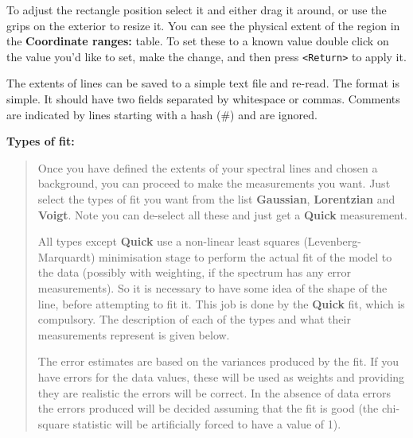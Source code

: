 \documentclass[twoside,11pt]{article}
\renewcommand{\_}{\texttt{\symbol{95}}}
\newcommand{\labelitem}[1]{\textbf{#1}}
\newcommand{\hitext}[1]{\texttt{#1}}
\newcommand{\subheading}[1]{\textbf{\large{#1}}}
\begin{document}
To adjust the rectangle position select it and either drag it around,
or use the grips on the exterior to resize it. You can see the
physical extent of the region in the \labelitem{Coordinate ranges:}
table. To set these to a known value double click on the value you'd
like to set, make the change, and then press \hitext{<Return>} to
apply it.

The extents of lines can be saved to a simple text file and
re-read. The format is simple. It should have two fields separated by
whitespace or commas. Comments are indicated by lines starting with a
hash (\#) and are ignored.

\subheading{Types of fit:}
\begin{quote}
 Once you have defined the extents of your spectral lines and chosen a
 background, you can proceed to make the measurements you want. Just
 select the types of fit you want from the list \labelitem{Gaussian},
 \labelitem{Lorentzian} and \labelitem{Voigt}. Note you can de-select
 all these and just get a \labelitem{Quick} measurement.

 All types except \labelitem{Quick} use a non-linear least squares
 (Levenberg-Marquardt) minimisation stage to perform the actual fit of
 the model to the data (possibly with weighting, if the spectrum has
 any error measurements). So it is necessary to have some idea of the
 shape of the line, before attempting to fit it. This job is done by
 the \labelitem{Quick} fit, which is compulsory. The description of
 each of the types and what their measurements represent is given
 below.

 The error estimates are based on the variances produced by the fit.
 If you have errors for the data values, these will be used as weights
 and providing they are realistic the errors will be correct. In the
 absence of data errors the errors produced will be decided assuming
 that the fit is good (the chi-square statistic will be artificially
 forced to have a value of 1).


\end{quote}
\end{document}
